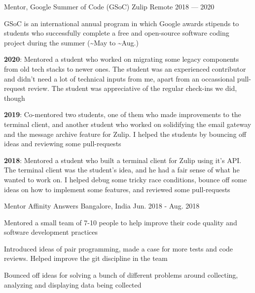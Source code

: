 
\begin{cventries}

  \cventry
      {Mentor, Google Summer of Code (GSoC)}
      {Zulip }
      {Remote} %
      {2018 --- 2020} %
      {
        \begin{cvitems} %
        \item {GSoC is an international annual program in which Google awards stipends to students who successfully complete a free and open-source software coding project during the summer (\textasciitilde May to \textasciitilde Aug.)}
        \item {\textbf{2020}: Mentored a student who worked on migrating some legacy components from old tech stacks to newer ones. The student was an experienced contributor and didn't need a lot of technical inputs from me, apart from an occassional pull-request review. The student was appreciative of the regular check-ins we did, though}
        \item {\textbf{2019}: Co-mentored two students, one of them who made improvements to the terminal client, and another student who worked on solidifying the email gateway and the message archive feature for Zulip. I helped the students by bouncing off ideas and reviewing some pull-requests}
        \item {\textbf{2018}: Mentored a student who built a terminal client for Zulip using it's API. The terminal client was the student's idea, and he had a fair sense of what he wanted to work on. I helped debug some tricky race conditions, bounce off some ideas on how to implement some features, and reviewed some pull-requests}
        \end{cvitems}
      }
  \cventry
      {Mentor}
      {Affinity Answers }
      {Bangalore, India} %
      {Jun. 2018 - Aug. 2018} %
      {
        \begin{cvitems} %
        \item {Mentored a small team of 7-10 people to help improve their code quality and software development practices}
        \item {Introduced ideas of pair programming, made a case for more tests and code reviews. Helped improve the git discipline in the team}
        \item {Bounced off ideas for solving a bunch of different problems around collecting, analyzing and displaying data being collected}
        \end{cvitems}
      }
\end{cventries}
